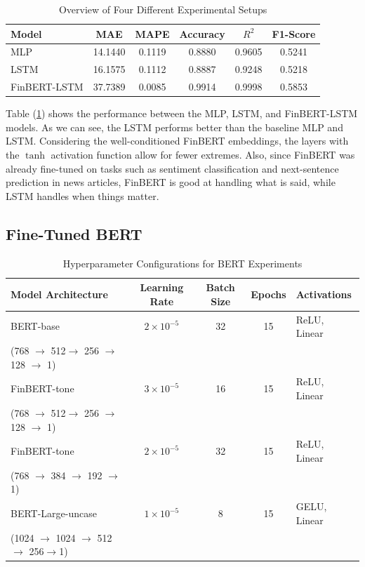 \documentclass[12pt]{article}
\begin{document}
\begin{table}[ht]
	\centering
	\begin{tabular}{@{} l c c c c c @{}}
		\toprule
		\textbf{Model} & \textbf{MAE} & \textbf{MAPE} & \textbf{Accuracy} & $R^2$ & \textbf{F1-Score} \\
		\midrule
		MLP & 14.1440  & 0.1119 & 0.8880 & 0.9605 & 0.5241 \\
		LSTM & 16.1575  & 0.1112 & 0.8887 & 0.9248 & 0.5218 \\
		FinBERT-LSTM  &  37.7389 & 0.0085 & 0.9914 & 0.9998 & 0.5853  \\
		\bottomrule
	\end{tabular}
	\caption{Overview of Four Different Experimental Setups}
	\label{tab:pretrained}
\end{table}

Table (\ref{tab:pretrained}) shows the performance between the MLP, LSTM, and FinBERT-LSTM models. As we can see, the LSTM performs better than the baseline MLP and LSTM. Considering the well-conditioned FinBERT embeddings, the layers with the $\tanh$ activation function allow for fewer extremes. Also, since FinBERT was already fine-tuned on tasks such as sentiment classification and next-sentence prediction in news articles, FinBERT is good at handling what is said, while LSTM handles when things matter.

\subsection*{Fine-Tuned BERT}

\begin{table}[h!]
	\centering
	\caption{Hyperparameter Configurations for BERT Experiments}
	\begin{tabular}{lcccl}
		\hline
		 \textbf{Model Architecture} & \textbf{Learning Rate} & \textbf{Batch Size} & \textbf{Epochs} & \textbf{Activations} \\ \hline
		BERT-base & $2\times 10^{-5}$ & 32 & 15 & ReLU, Linear \\[3pt]
		 (768 $\rightarrow$ 512$\rightarrow$ 256 $\rightarrow$ 128 $\rightarrow$ 1) & & &&  \\ 
		FinBERT-tone & $3\times 10^{-5}$ & 16 & 15 & ReLU, Linear \\[3pt]
		 (768 $\rightarrow$ 512$\rightarrow$ 256 $\rightarrow$ 128 $\rightarrow$ 1) & & &&  \\ 
		FinBERT-tone & $2\times 10^{-5}$ & 32 & 15 & ReLU, Linear \\[3pt]
		 (768 $\rightarrow$ 384 $\rightarrow$ 192 $\rightarrow$ 1) & & &  &\\ 
		BERT-Large-uncase & $1\times 10^{-5}$ & 8 & 15 & GELU, Linear \\[3pt]
		 (1024 $\rightarrow$ 1024 $\rightarrow$ 512 $\rightarrow$ 256$\rightarrow$1) & & &&\\ \hline
	\end{tabular}
	\label{tab:hyperparams}
\end{table}
\end{document}
